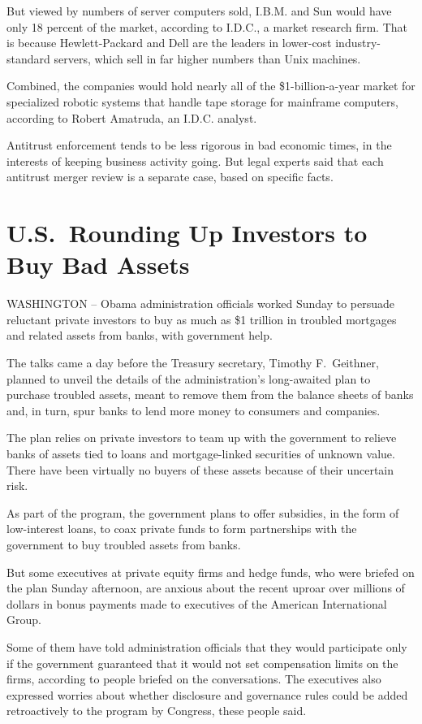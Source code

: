 \documentclass[12pt,a4paper,onecolumn]{article}
\begin{document}
\begin{CJK*}{GBK}{song}
But viewed by numbers of server computers sold, I.B.M. and Sun would have only 18 percent of the
market, according to I.D.C., a market research firm. That is because Hewlett-Packard and Dell are
the leaders in lower-cost industry-standard servers, which sell in far higher numbers than Unix
machines.

Combined, the companies would hold nearly all of the \$1-billion-a-year market for specialized
robotic systems that handle tape storage for mainframe computers, according to Robert Amatruda, an
I.D.C. analyst.

Antitrust enforcement tends to be less rigorous in bad economic times, in the interests of keeping
business activity going. But legal experts said that each antitrust merger review is a separate
case, based on specific facts.


\section{U.S.~Rounding Up Investors to Buy Bad Assets}

WASHINGTON -- Obama administration officials worked Sunday to persuade reluctant private investors
to buy as much as \$1 trillion in troubled mortgages and related assets from banks, with government
help.

The talks came a day before the Treasury secretary, Timothy F.~Geithner, planned to unveil the
details of the administration's long-awaited plan to purchase troubled assets, meant to remove them
from the balance sheets of banks and, in turn, spur banks to lend more money to consumers and
companies.

The plan relies on private investors to team up with the government to relieve banks of assets tied
to loans and mortgage-linked securities of unknown value. There have been virtually no buyers of
these assets because of their uncertain risk.

As part of the program, the government plans to offer subsidies, in the form of low-interest loans,
to coax private funds to form partnerships with the government to buy troubled assets from banks.

But some executives at private equity firms and hedge funds, who were briefed on the plan Sunday
afternoon, are anxious about the recent uproar over millions of dollars in bonus payments made to
executives of the American International Group.

Some of them have told administration officials that they would participate only if the government
guaranteed that it would not set compensation limits on the firms, according to people briefed on
the conversations. The executives also expressed worries about whether disclosure and governance
rules could be added retroactively to the program by Congress, these people said.


\end{CJK*}
\end{document}
